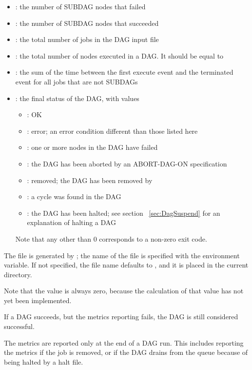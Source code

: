 \begin{itemize}
\item {}: the number of SUBDAG nodes that failed
\item {}: the number of SUBDAG nodes that succeeded
\item {}: the total number of jobs in
the DAG input file
\item {}: the total number of nodes executed in a DAG.
It should be equal to 
\item {}: the sum of the time between the first
execute event and the terminated event for all jobs that are not SUBDAGs
\item {}: the final status of the DAG, with values
  \begin{itemize}
  \item {}: OK
  \item {}: error; an error condition different than those listed here
  \item {}: one or more nodes in the DAG have failed
  \item {}: the DAG has been aborted by an ABORT-DAG-ON specification
  \item {}: removed; the DAG has been removed by 
  \item {}: a cycle was found in the DAG
  \item {}: the DAG has been halted; see section ~\ref{sec:DagSuspend} 
for an explanation of halting a DAG
  \end{itemize}
Note that any  other than 0 corresponds to a non-zero
exit code.
\end{itemize}

The  file is generated by ;
 the name of the  file
is specified with the  environment
variable.
If not specified, the file name defaults to 
, and it is placed in the current directory.

Note that the  value is always zero,
because the calculation of that value has not yet been implemented.

If a DAG succeeds, but the metrics reporting fails, the DAG is
still considered successful.

The metrics are reported only at the end of a DAG run.
This includes reporting the metrics if the  job is removed, 
or if the DAG drains from the queue because of being halted by a halt
file.

